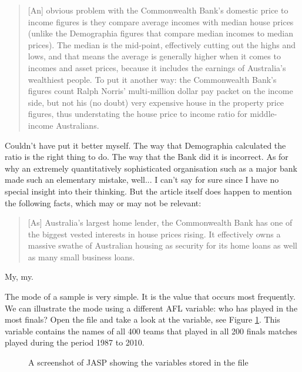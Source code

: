 \small
\begin{quote}
[An] obvious problem with the Commonwealth Bank's domestic price to income figures is they compare average incomes with median house prices (unlike the Demographia figures that compare median incomes to median prices). The median is the mid-point, effectively cutting out the highs and lows, and that means the average is generally higher when it comes to incomes and asset prices, because it includes the earnings of Australia's wealthiest people. To put it another way: the Commonwealth Bank's figures count Ralph Norris' multi-million dollar pay packet on the income side, but not his (no doubt) very expensive house in the property price figures, thus understating the house price to income ratio for middle-income Australians.
\end{quote}
\normalsize
Couldn't have put it better myself. The way that Demographia calculated the ratio is the right thing to do. The way that the Bank did it is incorrect. As for why an extremely quantitatively sophisticated organisation such as a major bank made such an elementary mistake, well... I can't say for sure since I have no special insight into their thinking. But the article itself does happen to mention the following facts, which may or may not be relevant:
\small
\begin{quote}
[As] Australia's largest home lender, the Commonwealth Bank has one of the biggest vested interests in house prices rising. It effectively owns a massive swathe of Australian housing as security for its home loans as well as many small business loans.
\end{quote}
\normalsize
My, my. 


The mode of a sample is very simple. It is the value that occurs most frequently. We can illustrate the mode using a different AFL variable: who has played in the most finals? Open the  file and take a look at the  variable, see Figure \ref{fig:aflsmall_finalists}. This variable contains the names of all 400 teams that played in all 200 finals matches played during the period 1987 to 2010. 

\begin{figure}[!!htp]
\begin{center}
\caption{A screenshot of JASP showing the variables stored in the  file}
\label{fig:aflsmall_finalists}
\HR
\end{center}
\end{figure}

